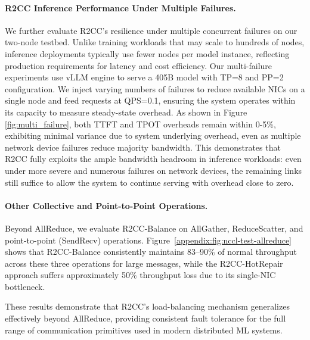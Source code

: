 \documentclass[letterpaper,twocolumn,10pt]{article}
\begin{document}
\paragraph{R2CC Inference Performance Under Multiple Failures.}\label{multi-failure-inference} We further evaluate R2CC's resilience under multiple concurrent failures on our two-node testbed. Unlike training workloads that may scale to hundreds of nodes, inference deployments typically use fewer nodes per model instance, reflecting production requirements for latency and cost efficiency. Our multi-failure experiments use vLLM engine to serve a 405B model with TP=8 and PP=2 configuration. We inject varying numbers of failures to reduce available NICs on a single node and feed requests at QPS=0.1, ensuring the system operates within its capacity to measure steady-state overhead. As shown in Figure \ref{fig:multi_failure}, both TTFT and TPOT overheads remain within 0-5\%, exhibiting minimal variance due to system underlying overhead, even as multiple network device failures reduce majority bandwidth. This demonstrates that R2CC fully exploits the ample bandwidth headroom in inference workloads: even under more severe and numerous failures on network devices, the remaining links still suffice to allow the system to continue serving with overhead close to zero.

\paragraph{Other Collective and Point-to-Point Operations.}
Beyond AllReduce, we evaluate R2CC-Balance on AllGather, ReduceScatter, and point-to-point (SendRecv) operations. Figure~\ref{appendix:fig:nccl-test-allreduce} shows that R2CC-Balance consistently maintains 83--90\% of normal throughput across these three operations for large messages, while the R2CC-HotRepair approach suffers approximately 50\% throughput loss due to its single-NIC bottleneck.

These results demonstrate that R2CC's load-balancing mechanism generalizes effectively beyond AllReduce, providing consistent fault tolerance for the full range of communication primitives used in modern distributed ML systems.
\end{document}

